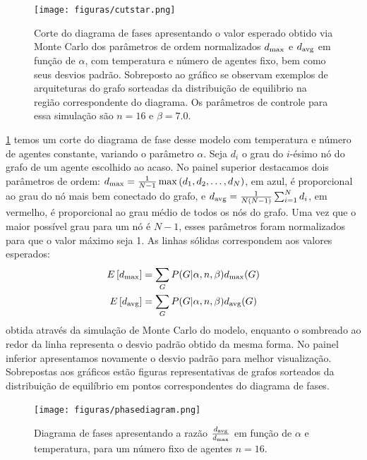 \begin{figure}
  \texttt{[image: figuras/cutstar.png]}
  \caption[Corte do diagrama de fases apresentando o valor esperado dos parâmetros de ordem.]{Corte do diagrama de fases apresentando o valor esperado obtido via  Monte Carlo dos parâmetros de ordem normalizados $d_{\text{max}}$ e $d_{\text{avg}}$ em função de $\alpha$, com temperatura e número de agentes fixo, bem como seus desvios padrão. Sobreposto ao gráfico se observam exemplos de arquiteturas do grafo sorteadas da distribuição de equilibrio na região correspondente do diagrama. Os parâmetros de controle para essa simulação são $n = 16$ e $\beta = 7.0$. }
  \label{fig:cutstar}
\end{figure}
 \ref{fig:cutstar} temos um corte do diagrama de fase desse modelo com temperatura e número de agentes constante, variando o parâmetro $\alpha$. Seja $d_i$ o grau do $i$-ésimo nó do grafo de um agente escolhido ao acaso. No painel superior destacamos dois parâmetros de ordem: $d_{\text{max}} = \frac{1}{N-1}\max\left(d_1, d_2,\ldots, d_N\right)$, em azul, é proporcional ao grau do nó mais bem conectado do grafo, e $d_{\text{avg}} = \frac{1}{N(N-1)}\sum_{i=1}^N d_i$, em vermelho, é proporcional ao grau médio de todos os nós do grafo. Uma vez que o maior possível grau para um nó é $N-1$, esses parâmetros foram normalizados para que o valor máximo seja 1. As linhas sólidas correspondem aos valores esperados:
\begin{align}
E\left[d_{\text{max}}\right] &= \sum_{G} P(G | \alpha, n, \beta) d_{\text{max}}(G) \\
E\left[d_{\text{avg}}\right] &= \sum_{G} P(G | \alpha, n, \beta) d_{\text{avg}}(G)
\end{align}
obtida através da simulação de Monte Carlo do modelo, enquanto o sombreado ao redor da linha representa o desvio padrão obtido da mesma forma. No painel inferior apresentamos novamente o desvio padrão para melhor visualização. Sobrepostas aos gráficos estão figuras representativas de grafos sorteados da distribuição de equilíbrio em pontos correspondentes do diagrama de fases. 
\begin{fullwidth}
\begin{figure}
	\texttt{[image: figuras/phasediagram.png]}
 	\caption{ Diagrama de fases apresentando a razão $\frac{d_{\text{avg}}}{d_{\text{max}}}$ em função de $\alpha$ e temperatura, para um número fixo de agentes $n=16$.}
 	\label{fig:phasediagram}
\end{figure}
\end{fullwidth}
